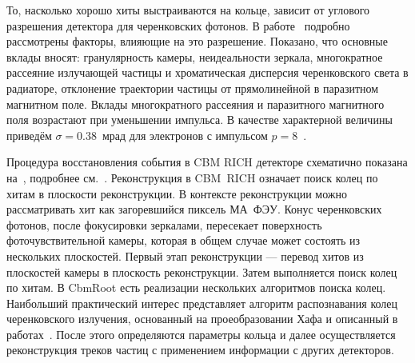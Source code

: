 То, насколько хорошо хиты выстраиваются на кольце, зависит от углового разрешения детектора для черенковских фотонов. В работе~\cite{TDR_RICH, KOPFERDISS} подробно рассмотрены факторы, влияющие на это разрешение. Показано, что основные вклады вносят: гранулярность камеры, неидеальности зеркала, многократное рассеяние излучающей частицы и хроматическая дисперсия черенковского света в радиаторе, отклонение траектории частицы от прямолинейной в паразитном магнитном поле.
Вклады многократного рассеяния и паразитного магнитного поля возрастают при уменьшении импульса. В качестве характерной величины приведём $\sigma = 0.38$~мрад для электронов с импульсом $p=8$~\GeVoverC{}.


\bigskip

Процедура восстановления события в CBM RICH детекторе схематично показана на~, подробнее см.~\cite{RICHreco}.
Реконструкция в CBM~RICH означает поиск колец по хитам в плоскости реконструкции. В контексте реконструкции можно рассматривать хит как загоревшийся пиксель МА~ФЭУ. Конус черенковских фотонов, после фокусировки зеркалами, пересекает поверхность фоточувствительной камеры, которая в общем случае может состоять из нескольких плоскостей. Первый этап реконструкции --- перевод хитов из плоскостей камеры в плоскость реконструкции. Затем выполняется поиск колец по хитам. В CbmRoot есть реализации нескольких алгоритмов поиска колец. Наибольший практический интерес представляет алгоритм распознавания колец черенковского излучения, основанный на проеобразовании Хафа и описанный в работах~\cite{RECOPEPAN, RECO2}.
После этого определяются параметры кольца и далее осуществляется реконструкция треков частиц с применением информации с других детекторов.

